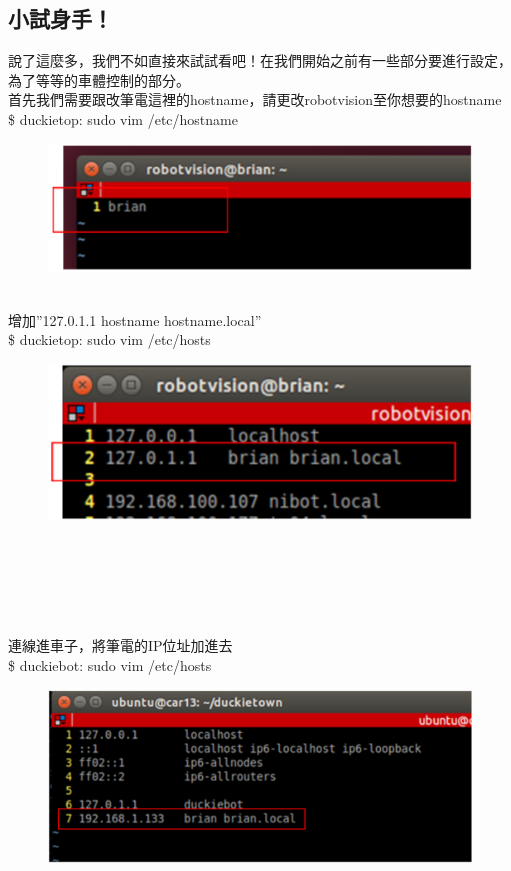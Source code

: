 \documentclass{article}
\begin{document}
\subsection{小試身手！}
說了這麼多，我們不如直接來試試看吧！在我們開始之前有一些部分要進行設定，為了等等的車體控制的部分。
\\首先我們需要跟改筆電這裡的hostname，請更改robotvision至你想要的hostname
\\\$ duckietop: sudo vim /etc/hostname 
\begin{figure}[htp]
    \begin{center}
        \includegraphics[width=400pt]{pic/3_3_3.png}
    \end{center}
\end{figure}
\\
增加”127.0.1.1 hostname hostname.local”
\\\$ duckietop: sudo vim /etc/hosts
\begin{figure}[htp]
    \begin{center}
        \includegraphics[width=400pt]{pic/3_3_4.png}
    \end{center}
\end{figure}
\\
\\\\\\\\連線進車子，將筆電的IP位址加進去
\\\$ duckiebot: sudo vim /etc/hosts 
\begin{figure}[htp]
    \begin{center}
        \includegraphics[width=400pt]{pic/3_3_5.png}
    \end{center}
\end{figure}
\end{document}

